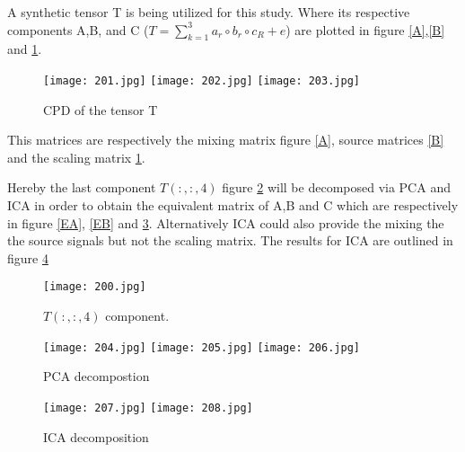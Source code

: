 A synthetic tensor T is being utilized for this study. Where its respective components A,B, and C ($T=\sum_{k=1}^{3}a_{r}\circ b_{r}\circ c_{R}+e$) are plotted in figure \ref{A},\ref{B} and \ref{C}.


\begin{figure}[!htbp]
%
\centering
\texttt{[image: 201.jpg]}
\label{A}
\endminipage\hfill
{}%
\centering
\texttt{[image: 202.jpg]}
\label{B}
\endminipage\hfill
{}%
\centering
\texttt{[image: 203.jpg]}
\label{C}
\endminipage\hfill
\caption{CPD of the tensor T}
\end{figure}

This matrices are respectively the mixing matrix figure \ref{A}, source matrices \ref{B} and the scaling matrix \ref{C}. 

Hereby the last component $T(:,:,4)$ figure \ref{T} will be decomposed via PCA and ICA in order to obtain the equivalent matrix of A,B and C which are respectively in figure \ref{EA}, \ref{EB} and  \ref{EC}. Alternatively ICA could also provide the mixing the the source signals but not the scaling matrix. The results for ICA are outlined in figure \ref{ICA_E}

\begin{figure}[!htbp]
\centering
\texttt{[image: 200.jpg]}
\caption{$T(:,:,4)$  component.}\label{T}
\end{figure}



\begin{figure}[!htbp]
%
\centering
\texttt{[image: 204.jpg]}
\label{EA}
\endminipage\hfill
{}%
\centering
\texttt{[image: 205.jpg]}
\label{EB}
\endminipage\hfill
{}%
\centering
\texttt{[image: 206.jpg]}
\label{EC}
\endminipage\hfill
\caption{PCA decompostion}
\end{figure}

\begin{figure}[!htbp]
%
\centering
\texttt{[image: 207.jpg]}
\endminipage\hfill
{}%
\centering
\texttt{[image: 208.jpg]}
\endminipage\hfill
\caption{ICA decomposition}\label{ICA_E}
\end{figure}

